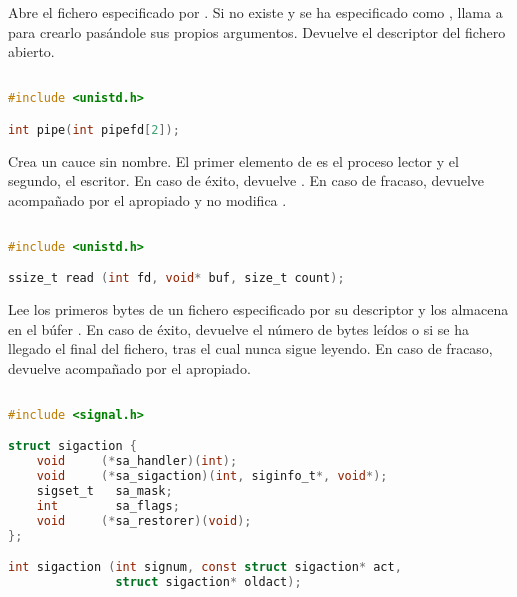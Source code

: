 Abre el fichero especificado por .
Si no existe y se ha especificado  como , llama a  para crearlo pasándole sus propios argumentos.
Devuelve el descriptor del fichero abierto.

\subsection{}\label{pipe}

\begin{lstlisting}[language=C]
#include <unistd.h>

int pipe(int pipefd[2]);
\end{lstlisting}

Crea un cauce sin nombre.
El primer elemento de  es el proceso lector y el segundo, el escritor.
En caso de éxito, devuelve .
En caso de fracaso, devuelve  acompañado por el  apropiado y no modifica .

\pagebreak

\subsection{}\label{read}

\begin{lstlisting}[language=C]
#include <unistd.h>

ssize_t read (int fd, void* buf, size_t count);
\end{lstlisting}

Lee los  primeros bytes de un fichero especificado por su descriptor  y los almacena en el búfer .
En caso de éxito, devuelve el número de bytes leídos o  si se ha llegado el final del fichero, tras el cual nunca sigue leyendo.
En caso de fracaso, devuelve  acompañado por el  apropiado.

\subsection{}\label{sigaction}

\begin{lstlisting}[language=C]
#include <signal.h>

struct sigaction {
	void     (*sa_handler)(int);
	void     (*sa_sigaction)(int, siginfo_t*, void*);
	sigset_t   sa_mask;
	int        sa_flags;
	void     (*sa_restorer)(void);
};

int sigaction (int signum, const struct sigaction* act,
               struct sigaction* oldact);
\end{lstlisting}

